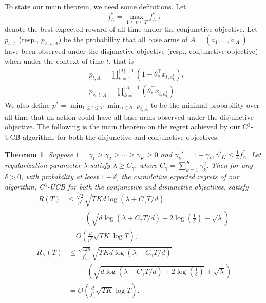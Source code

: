 \documentclass{article}
\newcommand{\cS}{\mathcal{S}}
\newcommand{\abs}[1]{\left| #1 \right|}
\newtheorem{theorem}{Theorem}[section]
\begin{document}
To state our main theorem, we need some definitions. Let
$$
f_{\wedge}^* = \max_{1 \leq t \leq T} f_{\wedge, t}^{\ast}
$$
denote the best expected reward of all time under the conjunctive objective.
Let $p_{t, A}$ (resp., $p_{\wedge, t, A}$) be the probability that all base arms of $A = (a_1, \ldots, a_{\abs{A}})$ have been observed under the disjunctive objective (resp., conjunctive objective) when under the context of time $t$, that is 
\begin{align*}
&p_{t, A} = \prod_{k=1}^{\abs{A}-1} (1 - \theta_{\ast}^{\top} x_{t, a_k^t}),\\
&p_{\wedge, t, A} = \prod_{k=1}^{\abs{A}-1} (\theta_{\ast}^{\top} x_{t, a_k^t}).
\end{align*}
We also define $p^* = \min_{1 \leq t \leq T} \min_{A \in \cS} ~ p_{t, A}$ to be the minimal probability over all time 
	that an action could have all base arms observed under the 
disjunctive objective. The following is the main theorem on the regret achieved by
	our C$^3$-UCB algorithm, for both the disjunctive and conjunctive objectives.
\begin{theorem}
\label{thm:main}
Suppose $1 = \gamma_1 \geq \gamma_2 \geq \cdots \geq \gamma_{K} \geq 0$ and 
$\gamma_k' = 1 - \gamma_k, \gamma'_K \leq \frac{1}{4}f_{\wedge}^{\ast}$.
Let regularization parameter $\lambda$ satisfy $\lambda \geq C_\gamma$,
	where $C_\gamma = \sum_{k=1}^{K} \gamma_k^2$. 
Then for any $\delta > 0$, with probability at least $1 - \delta$, the cumulative expected regrets of our algorithm, C$^3$-UCB for both the conjunctive and disjunctive objectives, satisfy
\begin{align}
R(T) &\le \frac{\sqrt{2}}{p^*} \sqrt{TKd\log(\lambda + C_\gamma T/d)}  \nonumber \\
&\qquad \cdot \left(\sqrt{d\log(\lambda + C_\gamma T/d) + 2\log\left(\frac{1}{\delta}\right)} + \sqrt{\lambda}\right) \nonumber \\
&=O\left(\frac{d}{p^*} \sqrt{TK} \log T\right),
\end{align}
\begin{align}
R_{\wedge}(T) &\le \frac{\sqrt{128}}{f_{\wedge}^{\ast}} \sqrt{TKd\log(\lambda + C_\gamma T/d)} \nonumber \\
&\qquad \cdot \left(\sqrt{d\log(\lambda + C_\gamma T/d) + 2\log\left(\frac{1}{\delta}\right)} + \sqrt{\lambda}\right) \nonumber \\
&=O\left(\frac{d}{f_{\wedge}^{\ast}}\sqrt{TK} \log T\right).
\end{align}
\end{theorem}
\end{document}
